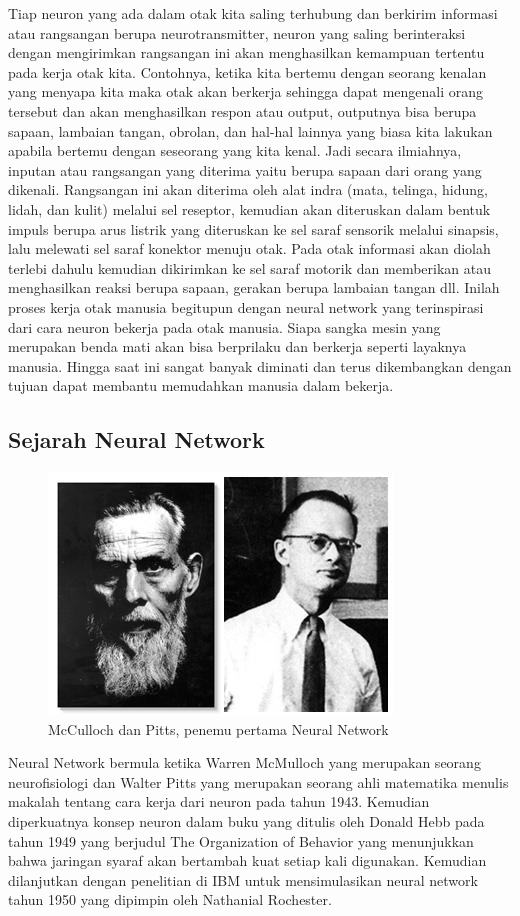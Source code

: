 Tiap neuron yang ada dalam otak kita saling terhubung dan berkirim informasi atau rangsangan berupa neurotransmitter, neuron yang saling berinteraksi dengan mengirimkan rangsangan ini akan menghasilkan kemampuan tertentu pada kerja otak kita. Contohnya, ketika kita bertemu dengan seorang kenalan yang menyapa kita maka otak akan berkerja sehingga dapat mengenali orang tersebut dan akan menghasilkan respon atau output, outputnya bisa berupa sapaan, lambaian tangan, obrolan, dan hal-hal lainnya yang biasa kita lakukan apabila bertemu dengan seseorang yang kita kenal. Jadi secara ilmiahnya, inputan atau rangsangan yang diterima yaitu berupa sapaan dari orang yang dikenali. Rangsangan ini akan diterima oleh alat indra (mata, telinga, hidung, lidah, dan kulit) melalui sel reseptor, kemudian akan diteruskan dalam bentuk impuls berupa arus listrik yang diteruskan ke sel saraf sensorik melalui sinapsis, lalu melewati sel saraf konektor menuju otak. Pada otak informasi akan diolah terlebi dahulu kemudian dikirimkan ke sel saraf motorik dan memberikan atau menghasilkan reaksi berupa sapaan, gerakan berupa lambaian tangan dll. Inilah proses kerja otak manusia begitupun dengan neural network yang terinspirasi dari cara neuron bekerja pada otak manusia. Siapa sangka mesin yang merupakan benda mati akan bisa berprilaku dan berkerja seperti layaknya manusia. Hingga saat ini sangat banyak diminati dan terus dikembangkan dengan tujuan dapat membantu memudahkan manusia dalam bekerja.

\subsection{Sejarah Neural Network}
\begin{figure}[H]
        \centerline{\includegraphics[scale=1]{figures/nn1}}
        \caption{McCulloch dan Pitts, penemu pertama Neural Network}
		\label{penemu}
\end{figure}
Neural Network bermula ketika Warren McMulloch yang merupakan seorang neurofisiologi dan Walter Pitts yang merupakan seorang ahli matematika menulis makalah tentang cara kerja dari neuron pada tahun 1943. Kemudian diperkuatnya konsep neuron dalam buku yang ditulis oleh Donald Hebb pada tahun 1949 yang berjudul The Organization of Behavior yang menunjukkan bahwa jaringan syaraf akan bertambah kuat setiap kali digunakan. Kemudian dilanjutkan dengan penelitian di IBM untuk mensimulasikan neural network tahun 1950 yang dipimpin oleh Nathanial Rochester.

